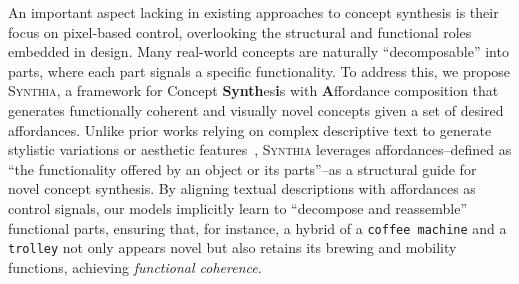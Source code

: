 
An important aspect lacking in existing approaches to concept synthesis is their focus on pixel-based control, overlooking the structural and functional roles embedded in design. Many real-world concepts are naturally ``decomposable'' into parts, where each part signals a specific functionality. To address this, we propose \textsc{Synthia}, a framework for Concept \textbf{Synth}es\textbf{i}s with \textbf{A}ffordance composition that generates functionally coherent and visually novel concepts given a set of desired affordances. Unlike prior works relying on complex descriptive text to generate stylistic variations or aesthetic features~\cite{richardson2024conceptlab, vinker2023concept}, \textsc{Synthia} leverages affordances--defined as ``the functionality offered by an object or its parts''--as a structural guide for novel concept synthesis. By aligning textual descriptions with affordances as control signals, our models implicitly learn to ``decompose and reassemble'' functional parts, ensuring that, for instance, a hybrid of a \texttt{coffee machine} and a \texttt{trolley} not only appears novel but also retains its brewing and mobility functions, achieving \textit{functional coherence}. 


